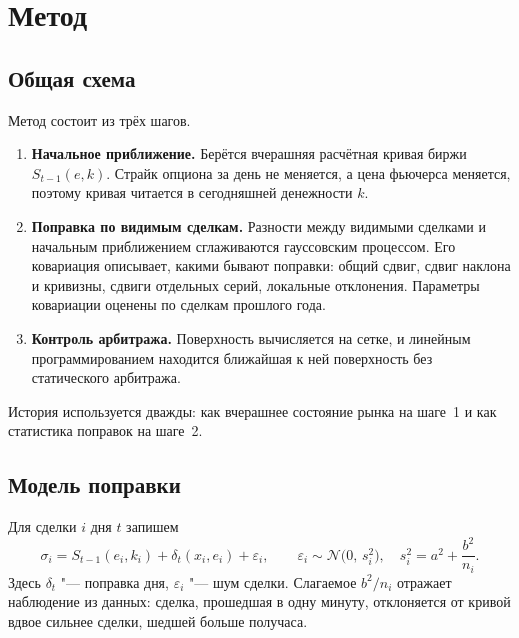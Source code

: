 \documentclass{article}
\begin{document}
\section{Метод}\label{sec:method}

\subsection{Общая схема}

Метод состоит из трёх шагов.
\begin{enumerate}
    \item \textbf{Начальное приближение.} Берётся вчерашняя расчётная кривая биржи $S_{t-1}(e,k)$. Страйк опциона за день не меняется, а цена фьючерса меняется, поэтому кривая читается в сегодняшней денежности $k$.
    \item \textbf{Поправка по видимым сделкам.} Разности между видимыми сделками и начальным приближением сглаживаются гауссовским процессом. Его ковариация описывает, какими бывают поправки: общий сдвиг, сдвиг наклона и кривизны, сдвиги отдельных серий, локальные отклонения. Параметры ковариации оценены по сделкам прошлого года.
    \item \textbf{Контроль арбитража.} Поверхность вычисляется на сетке, и линейным программированием находится ближайшая к ней поверхность без статического арбитража.
\end{enumerate}
История используется дважды: как вчерашнее состояние рынка на шаге~1 и как статистика поправок на шаге~2.

\subsection{Модель поправки}

Для сделки $i$ дня $t$ запишем
\begin{equation}\label{eq:model}
\sigma_i = S_{t-1}(e_i,k_i) + \delta_t(x_i,e_i) + \varepsilon_i,\qquad
\varepsilon_i\sim\mathcal{N}\bigl(0,\,s_i^2\bigr),\quad s_i^2=a^2+\frac{b^2}{n_i}.
\end{equation}
Здесь $\delta_t$ "--- поправка дня, $\varepsilon_i$ "--- шум сделки. Слагаемое $b^2/n_i$ отражает наблюдение из данных: сделка, прошедшая в одну минуту, отклоняется от кривой вдвое сильнее сделки, шедшей больше получаса.
\end{document}
